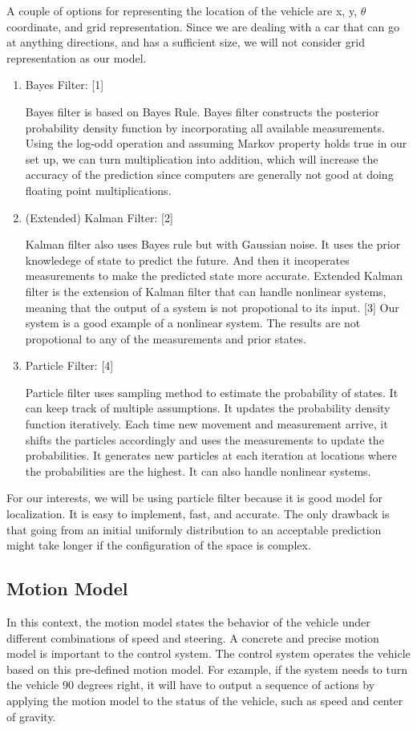 \documentclass[compsoc,draftclsnofoot,onecolumn,10pt]{IEEEtran}
\begin{document}
A couple of options for representing the location of the vehicle are x, y, $\theta$ coordinate,
and grid representation. Since we are dealing with a car that can go at anything directions, 
and has a sufficient size, we will not consider grid representation as our model.  
\begin{enumerate}
	\item Bayes Filter: [1]\par
	Bayes filter is based on Bayes Rule. Bayes filter constructs the posterior probability 
	density function by incorporating all available measurements. Using the log-odd operation 
	and assuming Markov property holds true in our set up, we can turn multiplication into 
	addition, which will increase the accuracy of the prediction since computers are generally 
	not good at doing floating point multiplications. 
	\item (Extended) Kalman Filter: [2]\par
	Kalman filter also uses Bayes rule but with Gaussian noise. It uses the prior knowledege 
	of state to predict the future. And then it incoperates measurements to make the predicted 
	state more accurate. Extended Kalman filter is the extension of Kalman filter that can 
	handle nonlinear systems, meaning that the output of a system is not propotional to its 
	input. [3] Our system is a good example of a nonlinear system. The results are not propotional 
	to any of the measurements and prior states.  
	\item Particle Filter: [4]\par
	Particle filter uses sampling method to estimate the probability of states. It can keep 
	track of multiple assumptions. It updates the probability density function iteratively. 
	Each time new movement and measurement arrive, it shifts the particles accordingly and 
	uses the measurements to update the probabilities. It generates new particles at each 
	iteration at locations where the probabilities are the highest. It can also handle 
	nonlinear systems. 
\end{enumerate}
For our interests, we will be using particle filter because it is good model for 
localization. It is easy to implement, fast, and accurate. The only drawback is that 
going from an initial uniformly distribution to an acceptable prediction might take 
longer if the configuration of the space is complex.

\subsection{Motion Model}
In this context, the motion model states the behavior of the vehicle under different 
combinations of speed and steering. A concrete and precise motion model is important to 
the control system. The control system operates the vehicle based on this pre-defined 
motion model. For example, if the system needs to turn the vehicle 90 degrees right, it 
will have to output a sequence of actions by applying the motion model to the status of 
the vehicle, such as speed and center of gravity.\par
\end{document}
